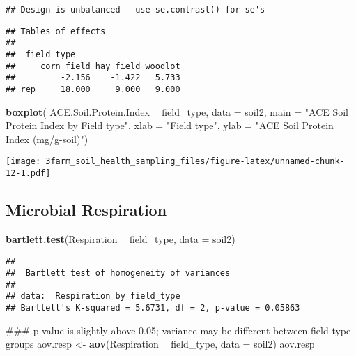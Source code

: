 \documentclass[]{article}
\newenvironment{Shaded}{\begin{snugshade}}{\end{snugshade}}
\newcommand{\KeywordTok}[1]{\textcolor[rgb]{0.13,0.29,0.53}{\textbf{#1}}}
\newcommand{\DataTypeTok}[1]{\textcolor[rgb]{0.13,0.29,0.53}{#1}}
\newcommand{\StringTok}[1]{\textcolor[rgb]{0.31,0.60,0.02}{#1}}
\newcommand{\OperatorTok}[1]{\textcolor[rgb]{0.81,0.36,0.00}{\textbf{#1}}}
\newcommand{\NormalTok}[1]{#1}
\begin{document}
\begin{verbatim}
## Design is unbalanced - use se.contrast() for se's
\end{verbatim}

\begin{verbatim}
## Tables of effects
## 
##  field_type 
##     corn field hay field woodlot
##         -2.156    -1.422   5.733
## rep     18.000     9.000   9.000
\end{verbatim}

\begin{Shaded}
\begin{Highlighting}[]
\KeywordTok{boxplot}\NormalTok{( ACE.Soil.Protein.Index }\OperatorTok{~}\StringTok{ }\NormalTok{field_type, }\DataTypeTok{data =}\NormalTok{ soil2, }\DataTypeTok{main =} \StringTok{"ACE Soil Protein Index by Field type"}\NormalTok{, }\DataTypeTok{xlab =} \StringTok{"Field type"}\NormalTok{, }\DataTypeTok{ylab =} \StringTok{"ACE Soil Protein Index (mg/g-soil)"}\NormalTok{)}
\end{Highlighting}
\end{Shaded}

\texttt{[image: 3farm\_soil\_health\_sampling\_files/figure-latex/unnamed-chunk-12-1.pdf]}

\subsection{Microbial Respiration}\label{microbial-respiration}

\begin{Shaded}
\begin{Highlighting}[]
\KeywordTok{bartlett.test}\NormalTok{(Respiration }\OperatorTok{~}\StringTok{ }\NormalTok{field_type, }\DataTypeTok{data =}\NormalTok{ soil2)}
\end{Highlighting}
\end{Shaded}

\begin{verbatim}
## 
##  Bartlett test of homogeneity of variances
## 
## data:  Respiration by field_type
## Bartlett's K-squared = 5.6731, df = 2, p-value = 0.05863
\end{verbatim}

\begin{Shaded}
\begin{Highlighting}[]
\NormalTok{### p-value is slightly above 0.05; variance may be different between field type groups}
\NormalTok{aov.resp <-}\StringTok{ }\KeywordTok{aov}\NormalTok{(Respiration }\OperatorTok{~}\StringTok{ }\NormalTok{field_type, }\DataTypeTok{data =}\NormalTok{ soil2)}
\NormalTok{aov.resp}
\end{Highlighting}
\end{Shaded}
\end{document}
